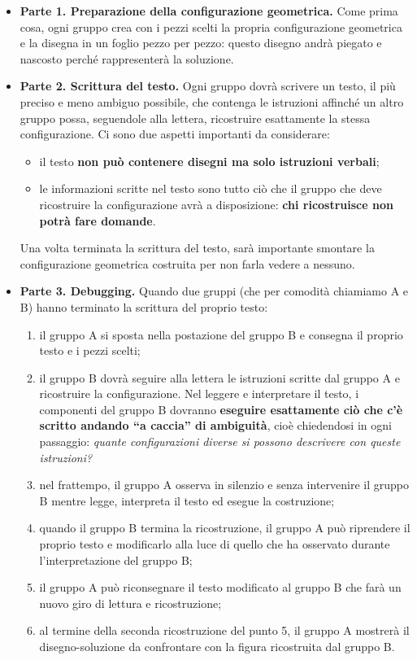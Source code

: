 \begin{itemize}
\item
  \textbf{Parte 1. Preparazione della configurazione geometrica.}
  Come prima cosa, ogni gruppo crea con i pezzi scelti la propria configurazione geometrica e la disegna in un foglio pezzo per pezzo: questo disegno andrà piegato e nascosto perché rappresenterà la soluzione.
\item
  \textbf{Parte 2. Scrittura del testo.}
  \ruoliattivita{\ruoloProgrammatore}
  Ogni gruppo dovrà scrivere un testo, il più preciso e meno ambiguo possibile, che contenga le istruzioni affinché un altro gruppo possa, seguendole alla lettera, ricostruire esattamente la stessa configurazione. Ci sono due aspetti importanti da considerare:

  \begin{itemize}
  \item
    il testo \textbf{non può contenere disegni ma solo istruzioni verbali};
  \item
    le informazioni scritte nel testo sono tutto ciò che il gruppo che deve ricostruire la configurazione avrà a disposizione: \textbf{chi ricostruisce non potrà fare domande}.
  \end{itemize}

  Una volta terminata la scrittura del testo, sarà importante smontare la configurazione geometrica costruita per non farla vedere a nessuno.
\item
  \textbf{Parte 3. Debugging.}
  \ruoliattivita{\ruoloEsecutore\quad\ruoloProgrammatore}
  Quando due gruppi (che per comodità chiamiamo A e B) hanno terminato la scrittura del proprio testo:

  \begin{enumerate}
  \def\labelenumi{\arabic{enumi}.}
  \item
    il gruppo A si sposta nella postazione del gruppo B e consegna il proprio testo e i pezzi scelti;
  \item
    il gruppo B dovrà seguire alla lettera le istruzioni scritte dal gruppo A e ricostruire la configurazione. Nel leggere e interpretare il testo, i componenti del gruppo B dovranno \textbf{eseguire esattamente ciò che c'è scritto andando ``a caccia'' di ambiguità}, cioè chiedendosi in ogni passaggio: \emph{quante configurazioni diverse si possono descrivere con queste istruzioni?}
  \item
    nel frattempo, il gruppo A osserva in silenzio e senza intervenire il gruppo B mentre legge, interpreta il testo ed esegue la costruzione;
  \item
    quando il gruppo B termina la ricostruzione, il gruppo A può riprendere il proprio testo e modificarlo alla luce di quello che ha osservato durante l'interpretazione del gruppo B;
  \item
    il gruppo A può riconsegnare il testo modificato al gruppo B che farà un nuovo giro di lettura e ricostruzione;
  \item
    al termine della seconda ricostruzione del punto 5, il gruppo A mostrerà il disegno-soluzione da confrontare con la figura ricostruita dal gruppo B.
  \end{enumerate}
\end{itemize}

